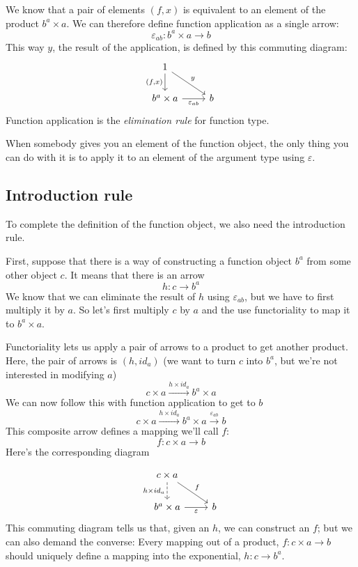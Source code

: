 \documentclass[DaoFP]{subfiles}
\begin{document}
We know that a pair of elements $(f, x)$ is equivalent to an element of the product $b^a \times a$. We can therefore define function application as a single arrow:
\[\varepsilon_{a b} \colon b^a \times a \to b\]
This way $y$, the result of the application, is defined by this commuting diagram:
\[
 \begin{tikzcd}
 1
 \arrow[d, "{(f, x)}"']
 \arrow[rd, "y"]
 \\
 b^a \times a
 \arrow[r, "\varepsilon_{a b}"']
& b
 \end{tikzcd}
\]
Function application is the \emph{elimination rule} for function type. 

When somebody gives you an element of the function object, the only thing you can do with it is to apply it to an element of the argument type using $\varepsilon$. 

\subsection{Introduction rule}
To complete the definition of the function object, we also need the introduction rule. 

First, suppose that there is a way of constructing a function object $b^a$ from some other object $c$. It means that there is an arrow
\[h \colon c \to b^a\]
We know that we can eliminate the result of $h$ using $\varepsilon_{a b}$, but we have to first multiply it by $a$. So let's first multiply $c$ by $a$ and the use functoriality to map it to $b^a \times a$. 

Functoriality lets us apply a pair of arrows to a product to get another product. Here, the pair of arrows is $(h, id_a)$ (we want to turn $c$ into $b^a$, but we're not interested in modifying $a$)
\[ c \times a \xrightarrow{h \times id_a} b^a \times a \]
We can now follow this with function application to get to $b$
\[ c \times a \xrightarrow{h \times id_a} b^a \times a \xrightarrow{\varepsilon_{a b}} b\]
This composite arrow defines a mapping we'll call $f$:
\[f \colon c \times a \to b\]
Here's the corresponding diagram

\[
 \begin{tikzcd}
 c \times a
 \arrow[d, dashed, "h \times id_a"']
 \arrow[rd, "f"]
 \\
 b^a \times a
 \arrow[r, "\varepsilon"']
& b
 \end{tikzcd}
\]
This commuting diagram tells us that, given an $h$, we can construct an $f$; but we can also demand the converse: Every mapping out of a product, $f \colon c \times a \to b$ should uniquely define a mapping into the exponential, $h \colon c \to b^a$. 
\end{document}
